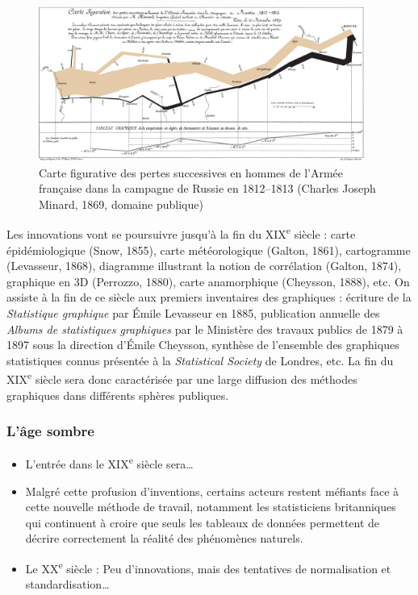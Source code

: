 \documentclass[]{article}
\providecommand{\tightlist}{%
  \setlength{\itemsep}{0pt}\setlength{\parskip}{0pt}}
\begin{document}
\begin{figure}
\centering
\includegraphics[width=0.95\textwidth,height=\textheight]{img/chap1/minard.png}
\caption{Carte figurative des pertes successives en hommes de l'Armée française dans la campagne de Russie en 1812--1813 (Charles Joseph Minard, 1869, domaine publique)}
\end{figure}

Les innovations vont se poursuivre jusqu'à la fin du XIX\textsuperscript{e} siècle : carte épidémiologique (Snow, 1855), carte météorologique (Galton, 1861), cartogramme (Levasseur, 1868), diagramme illustrant la notion de corrélation (Galton, 1874), graphique en 3D (Perrozzo, 1880), carte anamorphique (Cheysson, 1888), etc. On assiste à la fin de ce siècle aux premiers inventaires des graphiques : écriture de la \emph{Statistique graphique} par Émile Levasseur en 1885, publication annuelle des \emph{Albums de statistiques graphiques} par le Ministère des travaux publics de 1879 à 1897 sous la direction d'Émile Cheysson, synthèse de l'ensemble des graphiques statistiques connus présentée à la \emph{Statistical Society} de Londres, etc. La fin du XIX\textsuperscript{e} siècle sera donc caractérisée par une large diffusion des méthodes graphiques dans différents sphères publiques.

\hypertarget{lage-sombre}{%
\subsubsection{L'âge sombre}\label{lage-sombre}}

\begin{itemize}
\tightlist
\item
  L'entrée dans le XIX\textsuperscript{e} siècle sera\ldots{}
\item
  Malgré cette profusion d'inventions, certains acteurs restent méfiants face à cette nouvelle méthode de travail, notamment les statisticiens britanniques qui continuent à croire que seuls les tableaux de données permettent de décrire correctement la réalité des phénomènes naturels.
\item
  Le XX\textsuperscript{e} siècle : Peu d'innovations, mais des tentatives de normalisation et standardisation\ldots{}
\end{itemize}
\end{document}
